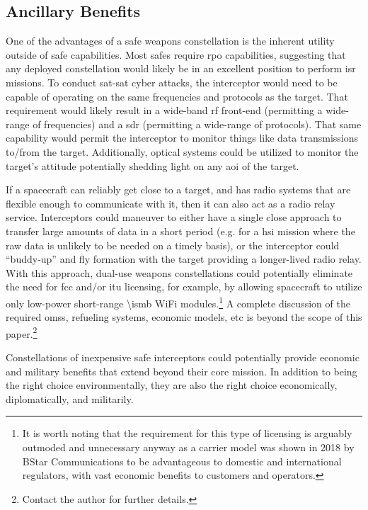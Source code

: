 \subsection{Ancillary Benefits}

One of the advantages of a \ac{safe} weapons constellation is the
inherent utility outside of \ac{safe} capabilities.  Most \acp{safe}
require \ac{rpo} capabilities, suggesting that any deployed
constellation would likely be in an excellent position to perform
\ac{isr} missions.  To conduct sat-sat cyber attacks, the interceptor
would need to be capable of operating on the same frequencies and
protocols as the target.  That requirement would likely result in a
wide-band \ac{rf} front-end (permitting a wide-range of frequencies)
and a \acf{sdr} (permitting a wide-range of protocols).  That same
capability would permit the interceptor to monitor things like data
transmissions to/from the target.  Additionally, optical systems
could be utilized to monitor the target's attitude potentially
shedding light on any \ac{aoi} of the target.

If a spacecraft can reliably get close to a target, and has radio
systems that are flexible enough to communicate with it, then it can
also act as a radio relay service.  Interceptors could maneuver to
either have a single close approach to transfer large amounts of data
in a short period (e.g. for a \acl{hsi} mission where the raw data is
unlikely to be needed on a timely basis), or the interceptor could
``buddy-up'' and fly formation with the target providing a
longer-lived radio relay.  With this approach, dual-use weapons
constellations could potentially eliminate the need for \ac{fcc}
and/or \ac{itu} licensing, for example, by allowing spacecraft to
utilize only low-power short-range \ac{\ismb} WiFi
modules.\footnote{It is worth noting that the requirement for this
type of licensing is arguably outmoded and unnecessary anyway as a
carrier model was shown in 2018 by BStar Communications to be
advantageous to domestic and international regulators, with vast
economic benefits to customers and operators.\cite{big-risks}} A
complete discussion of the required \acp{oms}, refueling systems,
economic models, etc is beyond the scope of this
paper.\footnote{Contact the author for further details.}

Constellations of inexpensive \ac{safe} interceptors could potentially
provide economic and military benefits that extend beyond their core
mission.  In addition to being the right choice environmentally, they
are also the right choice economically, diplomatically, and
militarily.
